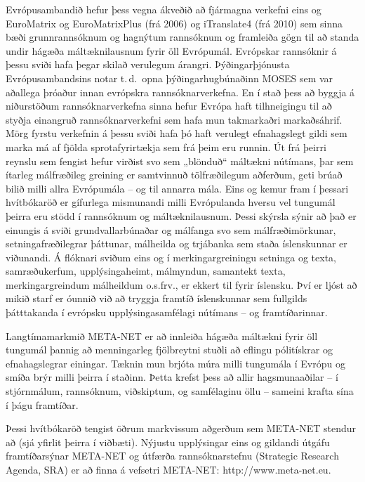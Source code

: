 \begin{multicols}{2}
Evrópusambandið hefur þess vegna ákveðið að fjármagna verkefni eins og EuroMatrix og EuroMatrixPlus (frá 2006) og iTranslate4 (frá 2010) sem sinna bæði grunnrannsóknum og hagnýtum rannsóknum og framleiða gögn til að standa undir hágæða máltæknilausnum fyrir öll Evrópumál. Evrópskar rannsóknir á þessu sviði hafa þegar skilað verulegum árangri. Þýðingarþjónusta Evrópusambandsins notar t.\,d.~opna þýðingarhugbúnaðinn MOSES sem var aðallega þróaður innan evrópskra rannsóknarverkefna. En í stað þess að byggja á niðurstöðum rannsóknarverkefna sinna hefur Evrópa haft tilhneigingu til að styðja einangruð rannsóknarverkefni sem hafa mun takmarkaðri markaðsáhrif. Mörg fyrstu verkefnin á þessu sviði hafa þó haft verulegt efnahagslegt gildi sem marka má af fjölda sprotafyrirtækja sem frá þeim eru runnin.
Út frá þeirri reynslu sem fengist hefur virðist svo sem „blönduð“ máltækni nútímans, þar sem ítarleg málfræðileg greining er samtvinnuð tölfræðilegum aðferðum, geti brúað bilið milli allra Evrópumála -- og til annarra mála. Eins og kemur fram í þessari hvítbókaröð er gífurlega mismunandi milli Evrópulanda hversu vel tungumál þeirra eru stödd í rannsóknum og máltæknilausnum. 
Þessi skýrsla sýnir að það er einungis á sviði grundvallarbúnaðar og málfanga svo sem málfræðimörkunar, setningafræðilegrar þáttunar, málheilda og trjábanka sem staða íslenskunnar er viðunandi. Á flóknari sviðum eins og í merkingargreiningu setninga og texta, samræðukerfum, upplýsingaheimt, málmyndun, samantekt texta, merkingargreindum málheildum o.s.frv., er ekkert til fyrir íslensku. Því er ljóst að mikið starf er óunnið við að tryggja framtíð íslenskunnar sem fullgilds þátttakanda í evrópsku upplýsingasamfélagi nútímans -- og framtíðarinnar.

Langtímamarkmið META-NET er að innleiða hágæða máltækni fyrir öll tungumál þannig að menningarleg fjölbreytni stuðli að eflingu pólitískrar og efnahagslegrar einingar. Tæknin mun brjóta múra milli tungumála í Evrópu og smíða brýr milli þeirra í staðinn. Þetta krefst þess að allir hagsmunaaðilar -- í stjórnmálum, rannsóknum, viðskiptum, og samfélaginu öllu -- sameini krafta sína í þágu framtíðar. 

Þessi hvítbókaröð tengist öðrum markvissum aðgerðum sem META-NET stendur að (sjá yfirlit þeirra í viðbæti). Nýjustu upplýsingar eins og gildandi útgáfu framtíðarsýnar \cite{Meta1} META-NET og útfærða rannsóknarstefnu (Strategic Research Agenda, SRA) er að finna á vefsetri META-NET: http://www.meta-net.eu.
\end{multicols}

